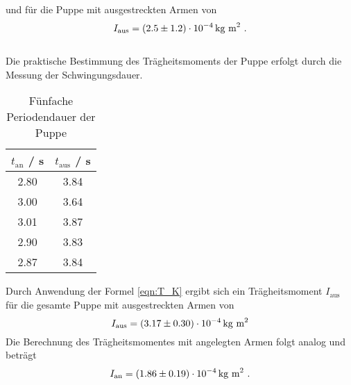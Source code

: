 und für die Puppe mit ausgestreckten Armen von
\begin{align}
	I_\text{aus} = (\num{2.5 +- 1.2}) \cdot 10^{-4} \, \text{kg m}^2 \ .
\end{align}
\ \\
Die praktische Bestimmung des Trägheitsmoments der Puppe erfolgt durch die Messung der Schwingungsdauer.
\begin{table}
	\centering
	\label{tab:TP}
	\caption{Fünfache Periodendauer der Puppe}
	\begin{tabular}{c c}
		\toprule
		$t_\text{an}$ / s & $t_\text{aus}$ / s \\
		\midrule
		2.80&3.84\\
		3.00&3.64\\
		3.01&3.87\\
		2.90&3.83\\
		2.87&3.84\\
		\bottomrule
	\end{tabular}
\end{table}
Durch Anwendung der Formel \ref{eqn:T_K} ergibt sich ein Trägheitsmoment $I_\text{aus}$ für die gesamte Puppe mit ausgestreckten Armen von
\begin{equation}
	I_\text{aus} = (\num{3.17 +- 0.30}) \cdot 10^{-4} \, \text{kg m}^2
\end{equation}
Die Berechnung des Trägheitsmomentes mit angelegten Armen folgt analog und beträgt
\begin{align}
	I_\text{an} = (\num{1.86 +- 0.19}) \cdot 10^{-4} \, \text{kg m}^2 \ .
\end{align}

